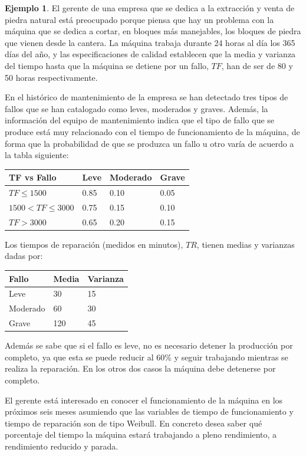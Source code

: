 \documentclass[
]{book}
\theoremstyle{definition}
\theoremstyle{definition}
\newtheorem{example}{Ejemplo}[chapter]
\theoremstyle{definition}
\theoremstyle{definition}
\theoremstyle{remark}
\begin{document}
\begin{example}
\protect\hypertarget{exm:secuencia2}{}\label{exm:secuencia2}El gerente de una empresa que se dedica a la extracción y venta de piedra natural está preocupado porque piensa que hay un problema con la máquina que se dedica a cortar, en bloques más manejables, los bloques de piedra que vienen desde la cantera. La máquina trabaja durante 24 horas al día los 365 días del año, y las especificaciones de calidad establecen que la media y varianza del tiempo hasta que la máquina se detiene por un fallo, \(TF\), han de ser de 80 y 50 horas respectivamente.

En el histórico de mantenimiento de la empresa se han detectado tres tipos de fallos que se han catalogado como leves, moderados y graves. Además, la información del equipo de mantenimiento indica que el tipo de fallo que se produce está muy relacionado con el tiempo de funcionamiento de la máquina, de forma que la probabilidad de que se produzca un fallo u otro varía de acuerdo a la tabla siguiente:

\begin{longtable}[]{@{}llll@{}}
\toprule
TF vs Fallo & Leve & Moderado & Grave \\
\midrule
\endhead
\(TF \leq 1500\) & 0.85 & 0.10 & 0.05 \\
\(1500 < TF \leq 3000\) & 0.75 & 0.15 & 0.10 \\
\(TF > 3000\) & 0.65 & 0.20 & 0.15 \\
\bottomrule
\end{longtable}

Los tiempos de reparación (medidos en minutos), \(TR\), tienen medias y varianzas dadas por:

\begin{longtable}[]{@{}lll@{}}
\toprule
Fallo & Media & Varianza \\
\midrule
\endhead
Leve & 30 & 15 \\
Moderado & 60 & 30 \\
Grave & 120 & 45 \\
\bottomrule
\end{longtable}

Además se sabe que si el fallo es leve, no es necesario detener la producción por completo, ya que esta se puede reducir al 60\% y seguir trabajando mientras se realiza la reparación. En los otros dos casos la máquina debe detenerse por completo.

El gerente está interesado en conocer el funcionamiento de la máquina en los próximos seis meses asumiendo que las variables de tiempo de funcionamiento y tiempo de reparación son de tipo Weibull. En concreto desea saber qué porcentaje del tiempo la máquina estará trabajando a pleno rendimiento, a rendimiento reducido y parada.
\end{example}
\end{document}
